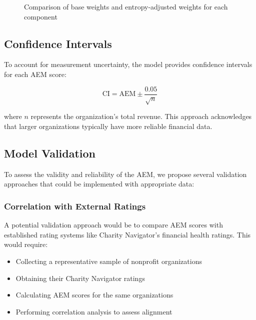 \documentclass[12pt]{article}
\begin{document}
\begin{figure}[H]
\centering
{}
\caption{Comparison of base weights and entropy-adjusted weights for each component}
\label{fig:weights}
\end{figure}

\subsection{Confidence Intervals}

To account for measurement uncertainty, the model provides confidence intervals for each AEM score:

\begin{equation}
    \text{CI} = \text{AEM} \pm \frac{0.05}{\sqrt{n}}
\end{equation}

where $n$ represents the organization's total revenue. This approach acknowledges that larger organizations typically have more reliable financial data.

\subsection{Model Validation}

To assess the validity and reliability of the AEM, we propose several validation approaches that could be implemented with appropriate data:

\subsubsection{Correlation with External Ratings}
A potential validation approach would be to compare AEM scores with established rating systems like Charity Navigator's financial health ratings. This would require:
\begin{itemize}
    \item Collecting a representative sample of nonprofit organizations
    \item Obtaining their Charity Navigator ratings
    \item Calculating AEM scores for the same organizations
    \item Performing correlation analysis to assess alignment
\end{itemize}
\end{document}
